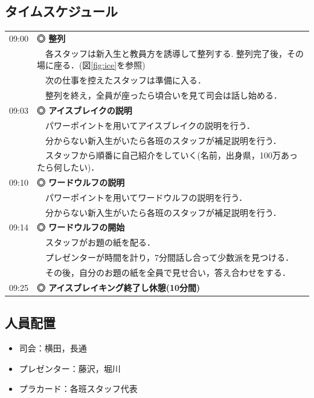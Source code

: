 \documentclass[a4j,titlepage]{jarticle}
\begin{document}
\subsection{タイムスケジュール}
\begin{longtable}{p{}p{}}
  09:00 & \textbf{◎ 整列} \\
        & \ \  各スタッフは新入生と教員方を誘導して整列する. 整列完了後，その場に座る．(図\ref{fig:ice}を参照) \\
        & \ \  次の仕事を控えたスタッフは準備に入る． \\
        & \ \  整列を終え，全員が座ったら頃合いを見て司会は話し始める．\\

  09:03 & \textbf{◎ アイスブレイクの説明}\\
        & \ \  パワーポイントを用いてアイスブレイクの説明を行う．\\
        & \ \  分からない新入生がいたら各班のスタッフが補足説明を行う．\\
        & \ \  スタッフから順番に自己紹介をしていく(名前，出身県，100万あったら何したい)． \\

  09:10 & \textbf{◎ ワードウルフの説明}\\
        & \ \  パワーポイントを用いてワードウルフの説明を行う．\\
        & \ \  分からない新入生がいたら各班のスタッフが補足説明を行う．\\

  09:14 & \textbf{◎ ワードウルフの開始}\\
        & \ \  スタッフがお題の紙を配る．\\
        & \ \  プレゼンターが時間を計り，7分間話し合って少数派を見つける．\\
        & \ \  その後，自分のお題の紙を全員で見せ合い，答え合わせをする．\\

  09:25 & \textbf{◎ アイスブレイキング終了し休憩(10分間)}\\

\end{longtable}


\subsection{人員配置}
\begin{itemize}
\item 司会：横田，長通
\item プレゼンター：藤沢，堀川
\item プラカード：各班スタッフ代表
\end{itemize}
\end{document}
